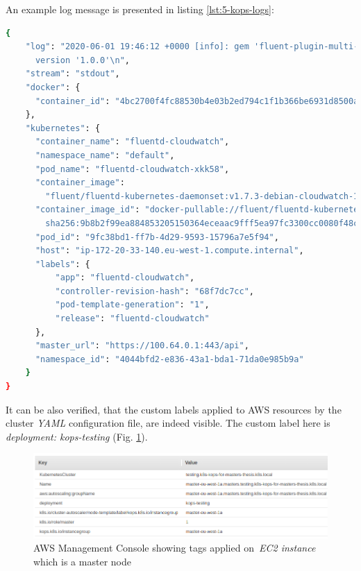 An example log message is presented in listing \ref{lst:5-kops-logs}:
\begin{lstlisting}[basicstyle=\scriptsize,xleftmargin=0cm,label=lst:5-kops-logs,caption={An example Kubernetes log message, presented on \textit{AWS CloudWatch}},captionpos=b,language=Bash,showstringspaces=false]
{
    "log": "2020-06-01 19:46:12 +0000 [info]: gem 'fluent-plugin-multi-format-parser'\
      version '1.0.0'\n",
    "stream": "stdout",
    "docker": {
      "container_id": "4bc2700f4fc88530b4e03b2ed794c1f1b366be6931d8500a8ccf21503d2c5b97"
    },
    "kubernetes": {
      "container_name": "fluentd-cloudwatch",
      "namespace_name": "default",
      "pod_name": "fluentd-cloudwatch-xkk58",
      "container_image":
        "fluent/fluentd-kubernetes-daemonset:v1.7.3-debian-cloudwatch-1.0",
      "container_image_id": "docker-pullable://fluent/fluentd-kubernetes-daemonset@\
        sha256:9b8b2f99ea884853205150364eceaac9fff5ea97fc3300cc0080f48c3eac8b8a",
      "pod_id": "9fc38bd1-ff7b-4d29-9593-15796a7e5f94",
      "host": "ip-172-20-33-140.eu-west-1.compute.internal",
      "labels": {
          "app": "fluentd-cloudwatch",
          "controller-revision-hash": "68f7dc7cc",
          "pod-template-generation": "1",
          "release": "fluentd-cloudwatch"
      },
      "master_url": "https://100.64.0.1:443/api",
      "namespace_id": "4044bfd2-e836-43a1-bda1-71da0e985b9a"
    }
}
\end{lstlisting}


It can be also verified, that the custom labels applied to AWS resources by the cluster \textit{YAML} configuration file, are indeed visible. The custom label here is \textit{deployment: kops-testing} (Fig. \ref{fig:kops-master-ec2-custom-tags}).
\begin{figure}[H]
    \centering
    \includegraphics[width=14cm]{figures/kops-master-ec2-custom-tags.png}
    \captionsetup{justification=centering,margin=2cm}
    \caption{AWS Management Console showing tags applied on~\textit{EC2 instance} which is a master node}
    \label{fig:kops-master-ec2-custom-tags}
\end{figure}

